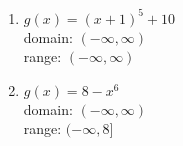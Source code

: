 \documentclass{ximera}
\begin{document}
\begin{multicols}{2}
\begin{enumerate}

\setcounter{enumi}{\value{HW}}
\item $g(x) = (x+1)^5+10$\\
domain: $(-\infty, \infty)$\\
range: $(-\infty, \infty)$\\

%

\vfill

\columnbreak

\item $g(x) = 8-x^{6}$\\
domain: $(-\infty, \infty)$\\
range: $(-\infty, 8]$\\



\setcounter{HW}{\value{enumi}}
\end{enumerate}
\end{multicols}
\end{document}
